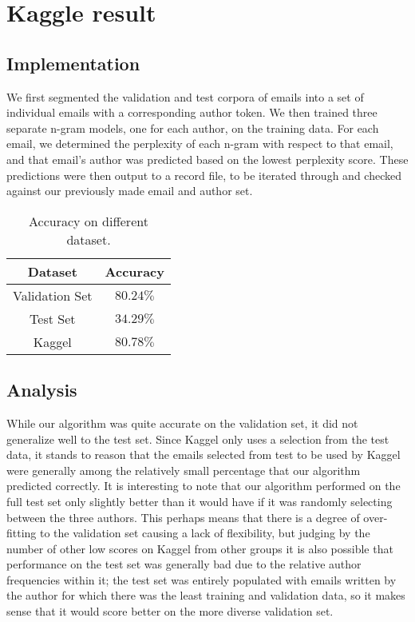 \documentclass[12pt]{article}
\begin{document}
\section{Kaggle result}

\subsection{Implementation}
We first segmented the validation and test corpora of emails into a set of individual emails with a corresponding author token. We then trained three separate n-gram models, one for each author, on the training data. For each email, we determined the perplexity of each n-gram with respect to that email, and that email’s author was predicted based on the lowest perplexity score. These predictions were then output to a record file, to be iterated through and checked against our previously made email and author set.
\begin{table}[htb]
\begin{center}
\begin{tabular}{|c|c|}
\hline
\textbf{Dataset} & \textbf{Accuracy}\\
\hline
Validation Set & $80.24\%$\\
\hline
Test Set & $34.29\%$\\
\hline
Kaggel & $80.78\%$\\
\hline
\end{tabular}
\caption{\label{table:kaggle-result}Accuracy on different dataset.}
\end{center}
\end{table}


\subsection{Analysis}
While our algorithm was quite accurate on the validation set, it did not generalize well to the test set.  Since Kaggel only uses a selection from the test data, it stands to reason that the emails selected from test to be used by Kaggel were generally among the relatively small percentage that our algorithm predicted correctly.  It is interesting to note that our algorithm performed on the full test set only slightly better than it would have if it was randomly selecting between the three authors.  This perhaps means that there is a degree of over-fitting to the validation set causing a lack of flexibility, but judging by the number of other low scores on Kaggel from other groups it is also possible that performance on the test set was generally bad due to the relative author frequencies within it; the test set was entirely populated with emails written by the author for which there was the least training and validation data, so it makes sense that it would score better on the more diverse validation set.



\end{document}

